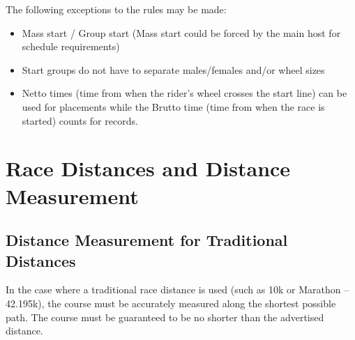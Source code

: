 The following exceptions to the rules may be made:
\begin{itemize}
\item Mass start / Group start (Mass start could be forced by the main host for schedule requirements) 
\item Start groups do not have to separate males/females and/or wheel sizes
\item Netto times (time from when the rider's wheel crosses the start line) can be used for placements while the Brutto time (time from when the race is started) counts for records.
\end{itemize}

\section{Race Distances and Distance Measurement}

\subsection {Distance Measurement for Traditional Distances}

In the case where a traditional race distance is used (such as 10k or Marathon -- 42.195k), the course must be accurately measured along the shortest possible path.
The course must be guaranteed to be no shorter than the advertised distance.

